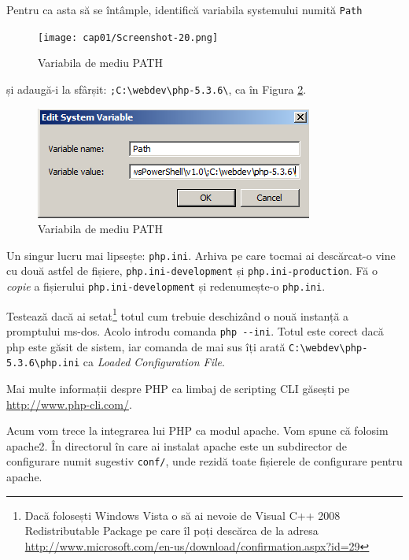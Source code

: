 Pentru ca asta să
se întâmple, identifică
variabila systemului numită \texttt{Path}
\begin{figure}[ht!]
  \centering
    \texttt{[image: cap01/Screenshot-20.png]}
  \caption{Variabila de mediu PATH}
  \label{img:win env path}
\end{figure}
și adaugă-i la sfârșit:
\texttt{;C:{\textbackslash}webdev{\textbackslash}php-5.3.6{\textbackslash}}, ca în
Figura \ref{img:win env path}.
\begin{figure}[ht!]
 \centering
   \includegraphics[width=180bp]{cap01/Screenshot-21.png}
 \caption{Variabila de mediu PATH}
 \label{img:win env path}
\end{figure}


Un singur lucru mai lipsește: \texttt{php.ini}. Arhiva pe care tocmai
ai descărcat-o vine cu două astfel de fișiere, \texttt{php.ini-development} și
\texttt{php.ini-production}. Fă o \textit{copie} a fișierului
\texttt{php.ini-development} și redenumește-o \texttt{php.ini}.

Testează dacă ai setat\footnote{Dacă folosești Windows Vista o
să ai nevoie de Visual C++ 2008 Redistributable Package pe care îl poți
descărca de la adresa \url{http://www.microsoft.com/en-us/download/confirmation.aspx?id=29}}
totul cum trebuie deschizând o nouă instanță a promptului ms-dos.
Acolo introdu comanda \texttt{php -{}-ini}.
Totul este corect dacă php este găsit de sistem, iar comanda de mai sus îți
arată \texttt{C:{\textbackslash}webdev{\textbackslash}php-5.3.6{\textbackslash}php.ini}
ca \textit{Loaded Configuration File}.

Mai multe informații despre PHP ca limbaj de scripting CLI găsești pe
\url{http://www.php-cli.com/}.

\vspace{1em}

Acum vom trece la integrarea lui PHP ca modul apache. Vom spune că folosim
apache2. În directorul în care ai instalat apache este un subdirector de configurare
numit sugestiv \texttt{conf/}, unde rezidă toate fișierele de configurare
pentru apache.

